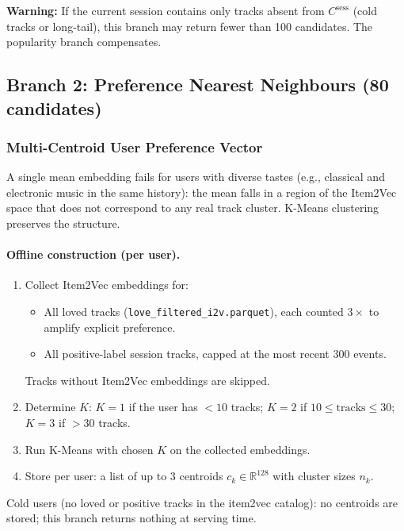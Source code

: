 \documentclass[11pt]{article}
\newcommand{\warn}[1]{\textcolor{warnorange}{\textbf{Warning:} #1}}
\begin{document}
\warn{If the current session contains only tracks absent from
$C^{\text{sess}}$ (cold tracks or long-tail), this branch may return
fewer than 100 candidates. The popularity branch compensates.}

\subsection{Branch 2: Preference Nearest Neighbours (80 candidates)}

\subsubsection{Multi-Centroid User Preference Vector}

A single mean embedding fails for users with diverse tastes
(e.g., classical and electronic music in the same history):
the mean falls in a region of the Item2Vec space that does not
correspond to any real track cluster. K-Means clustering preserves
the structure.

\paragraph{Offline construction (per user).}
\begin{enumerate}
  \item Collect Item2Vec embeddings for:
        \begin{itemize}
          \item All loved tracks (\texttt{love\_filtered\_i2v.parquet}),
                each counted $3\times$ to amplify explicit preference.
          \item All positive-label session tracks, capped at the
                most recent 300 events.
        \end{itemize}
        Tracks without Item2Vec embeddings are skipped.
  \item Determine $K$:
        $K = 1$ if the user has $< 10$ tracks;
        $K = 2$ if $10 \le \text{tracks} \le 30$;
        $K = 3$ if $> 30$ tracks.
  \item Run K-Means with chosen $K$ on the collected embeddings.
  \item Store per user: a list of up to 3 centroids
        $c_k \in \mathbb{R}^{128}$ with cluster sizes $n_k$.
\end{enumerate}

Cold users (no loved or positive tracks in the item2vec catalog):
no centroids are stored; this branch returns nothing at serving time.
\end{document}
